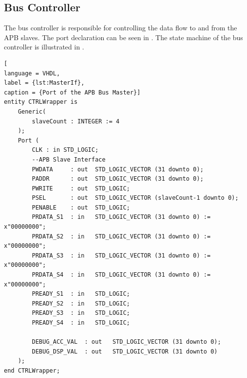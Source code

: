 \documentclass[%
	a4paper,
]
{article}
\begin{document}
\subsection{Bus Controller}
The bus controller is responsible for controlling the data flow to and from the APB slaves. The port declaration can be seen in . The state machine of the bus controller is illustrated in .

\begin{minipage}{\linewidth}
\begin{lstlisting}[
language = VHDL,
label = {lst:MasterIf},
caption = {Port of the APB Bus Master}]
entity CTRLWrapper is
    Generic(
        slaveCount : INTEGER := 4
    ); 
    Port ( 
        CLK : in STD_LOGIC;     
        --APB Slave Interface
        PWDATA     : out  STD_LOGIC_VECTOR (31 downto 0);
        PADDR      : out  STD_LOGIC_VECTOR (31 downto 0);
        PWRITE     : out  STD_LOGIC;
        PSEL       : out  STD_LOGIC_VECTOR (slaveCount-1 downto 0);
        PENABLE    : out  STD_LOGIC;
        PRDATA_S1  : in   STD_LOGIC_VECTOR (31 downto 0) := x"00000000";
        PRDATA_S2  : in   STD_LOGIC_VECTOR (31 downto 0) := x"00000000";
        PRDATA_S3  : in   STD_LOGIC_VECTOR (31 downto 0) := x"00000000";
        PRDATA_S4  : in   STD_LOGIC_VECTOR (31 downto 0) := x"00000000";
        PREADY_S1  : in   STD_LOGIC;        
        PREADY_S2  : in   STD_LOGIC;   
        PREADY_S3  : in   STD_LOGIC;
        PREADY_S4  : in   STD_LOGIC;
                      
        DEBUG_ACC_VAL  : out   STD_LOGIC_VECTOR (31 downto 0);
        DEBUG_DSP_VAL  : out   STD_LOGIC_VECTOR (31 downto 0)
    );
end CTRLWrapper;
\end{lstlisting}
\end{minipage}
\end{document}

